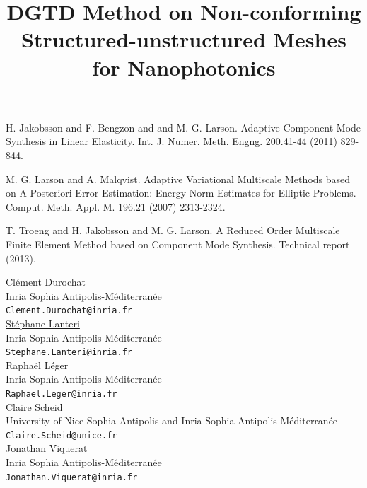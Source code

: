 \documentclass[article,A4,11pt]{llncs}%
\begin{document}

\begin{thebibliography}{10}
{\sc H. Jakobsson and F. Bengzon and and M. G. Larson}. {Adaptive Component Mode Synthesis in Linear Elasticity}. Int. J. Numer. Meth. Engng. 200.41-44 (2011) 829-844.

{\sc M. G. Larson and A. Malqvist}. {Adaptive Variational Multiscale Methods based on A Posteriori Error Estimation: Energy Norm Estimates for Elliptic Problems}. Comput. Meth. Appl. M. 196.21 (2007) 2313-2324.

{\sc T. Troeng and H. Jakobsson and M. G. Larson}. {A Reduced Order Multiscale Finite Element Method based on Component Mode Synthesis}. Technical report (2013).
\end{thebibliography}

\title{DGTD  Method  on  Non-conforming  Structured-unstructured  Meshes  for Nanophotonics}
 \author{} \institute{}
\maketitle
\begin{center}
{\large Clément Durochat}\\
Inria Sophia Antipolis-Méditerranée\\
{\tt Clement.Durochat@inria.fr}
\\ \vspace{4mm}
{\large \underline{Stéphane Lanteri}}\\
Inria Sophia Antipolis-Méditerranée\\
{\tt Stephane.Lanteri@inria.fr}
\\ \vspace{4mm}
{\large Raphaël Léger}\\
Inria Sophia Antipolis-Méditerranée\\
{\tt Raphael.Leger@inria.fr}
\\ \vspace{4mm}
{\large Claire Scheid}\\
University of Nice-Sophia Antipolis and Inria Sophia Antipolis-Méditerranée\\
{\tt Claire.Scheid@unice.fr}
\\ \vspace{4mm}
{\large Jonathan Viquerat}\\
Inria Sophia Antipolis-Méditerranée\\
{\tt Jonathan.Viquerat@inria.fr}
\end{center}
\end{document}
